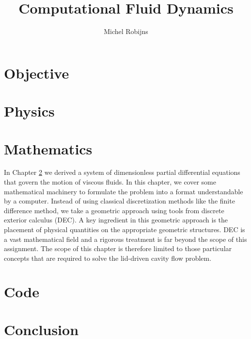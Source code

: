 \documentclass[a4paper,10pt,parskip=half]{scrreprt}
\begin{document}
\title{Computational Fluid Dynamics}
\author{Michel Robijns}

\maketitle

\tableofcontents

\chapter{Objective}



\chapter{Physics}
\label{cha:physics}



\chapter{Mathematics}
\label{cha:mathematics}

In Chapter \ref{cha:physics} we derived a system of dimensionless partial differential equations that govern the motion of viscous fluids. In this chapter, we cover some mathematical machinery to formulate the problem into a format understandable by a computer. Instead of using classical discretization methods like the finite difference method, we take a geometric approach using tools from discrete exterior calculus (DEC). A key ingredient in this geometric approach is the placement of physical quantities on the appropriate geometric structures. DEC is a vast mathematical field and a rigorous treatment is far beyond the scope of this assignment. The scope of this chapter is therefore limited to those particular concepts that are required to solve the lid-driven cavity flow problem.









\chapter{Code}

\chapter{Conclusion}
\end{document}
